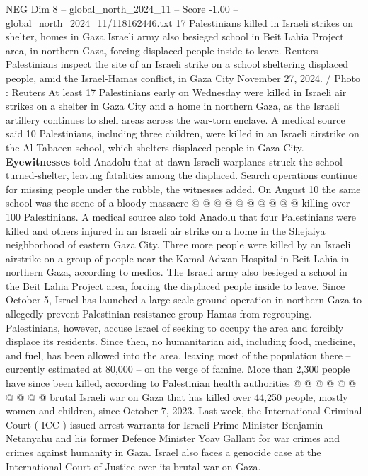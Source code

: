 \begin{textsample}{NEG Dim 8 – global\_north\_2024\_11 – Score -1.00 – global\_north\_2024\_11/118162446.txt}  \label{ex:f8_neg_309}
17 Palestinians killed in Israeli strikes on shelter, homes in Gaza Israeli army also besieged school in Beit Lahia Project area, in northern Gaza, forcing displaced people inside to leave.
Reuters Palestinians inspect the site of an Israeli strike on a school sheltering displaced people, amid the Israel-Hamas conflict, in Gaza City November 27, 2024. / Photo : Reuters At least 17 Palestinians early on Wednesday were killed in Israeli air strikes on a shelter in Gaza City and a home in northern Gaza, as the Israeli artillery continues to shell areas across the war-torn enclave.
A medical source said 10 Palestinians, including three children, were killed in an Israeli airstrike on the Al Tabaeen school, which shelters displaced people in Gaza City. \textbf{Eyewitnesses} told Anadolu that at dawn Israeli warplanes struck the school-turned-shelter, leaving fatalities among the displaced.
Search operations continue for missing people under the rubble, the witnesses added.
On August 10 the same school was the scene of a bloody massacre @ @ @ @ @ @ @ @ @ @ killing over 100 Palestinians.
A medical source also told Anadolu that four Palestinians were killed and others injured in an Israeli air strike on a home in the Shejaiya neighborhood of eastern Gaza City.
Three more people were killed by an Israeli airstrike on a group of people near the Kamal Adwan Hospital in Beit Lahia in northern Gaza, according to medics.
The Israeli army also besieged a school in the Beit Lahia Project area, forcing the displaced people inside to leave.
Since October 5, Israel has launched a large-scale ground operation in northern Gaza to allegedly prevent Palestinian resistance group Hamas from regrouping.
Palestinians, however, accuse Israel of seeking to occupy the area and forcibly displace its residents.
Since then, no humanitarian aid, including food, medicine, and fuel, has been allowed into the area, leaving most of the population there -- currently estimated at 80,000 -- on the verge of famine.
More than 2,300 people have since been killed, according to Palestinian health authorities @ @ @ @ @ @ @ @ @ @ brutal Israeli war on Gaza that has killed over 44,250 people, mostly women and children, since October 7, 2023.
Last week, the International Criminal Court ( ICC ) issued arrest warrants for Israeli Prime Minister Benjamin Netanyahu and his former Defence Minister Yoav Gallant for war crimes and crimes against humanity in Gaza.
Israel also faces a genocide case at the International Court of Justice over its brutal war on Gaza.

\end{textsample}
